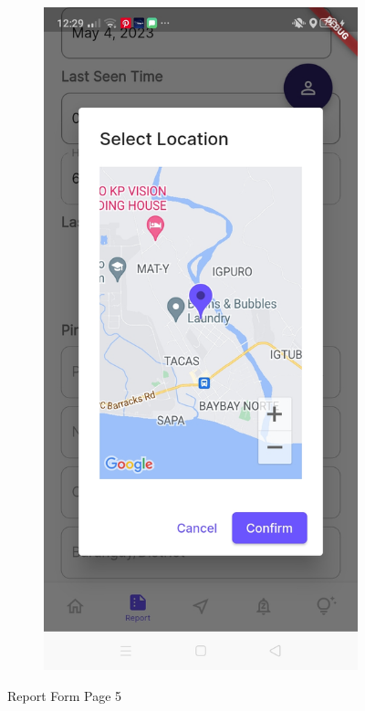 \begin{figure}[!h]
\begin{subfigure}[c]{0.30\linewidth}
    \end{subfigure}
    \centering
    \begin{subfigure}[c]{0.30\linewidth}
        \centering
        \includegraphics[scale=0.15]{figures/Chapter4/Main/p5-3.jpg}
    \end{subfigure}
    \caption{Report Form Page 5}
    \label{fig:ReportPage5}
\end{figure}
